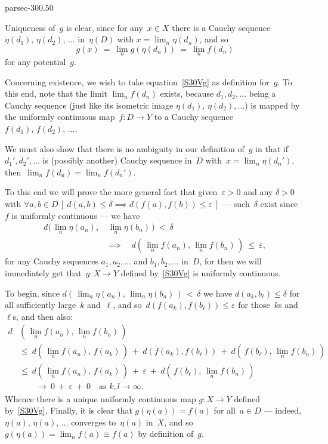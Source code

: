 \documentclass[b5page]{book}
\begin{document}
\begin{solution}{parsec-300.50}
\begin{enumerate}
Uniqueness of~$g$ is clear,
since for any~$x\in X$
there is a Cauchy sequence $\eta(d_1),\,\eta(d_2),\,\dotsc$
in~$\eta(D)$ 
with $x=\lim_n \eta(d_n)$, 
and so
\begin{equation}
\label{S30Vg}
\textstyle g(x)\ =\ \lim_n g(\eta(d_n))\ =\ \lim_n f(d_n)
\end{equation}
for any potential~$g$.

Concerning existence,
we wish to take equation~\eqref{S30Vg} as definition for~$g$.
To this end, note that the limit $\lim_n f(d_n)$ exists,
because $d_1,d_2,\dotsc$ being a Cauchy sequence
(just like its isometric image $\eta(d_1),\,\eta(d_2),\dotsc$)
is mapped by the uniformly continuous map~$f\colon D\to Y$
to a Cauchy sequence $f(d_1),\,f(d_2),\,\dotsc$.

We must also show that there is no ambiguity in our definition
of~$g$ in that if~$d_1',d_2',\dotsc$
is (possibly another) Cauchy sequence in~$D$
with~$x=\lim_n \eta(d_n')$,
then~$\lim_n f(d_n)=\lim_n f(d_n')$.

To this end we will prove the more general fact
that given~$\varepsilon>0$ and any $\delta>0$
with $\forall a,b\in D \,[\ d(a,b)\leq \delta
\implies d(f(a),f(b))\leq \varepsilon\ ]$
--- such~$\delta$ exist since~$f$ is uniformly continuous ---
we have
\begin{equation*}
\begin{alignedat}{3}
\textstyle
d(\,\lim_n\eta(a_n),&\,\textstyle \lim_n\eta(b_n)\,)\ <\  \delta\\
&\textstyle\implies\quad
d(\,\lim_n f(a_n),\,\lim_n f(b_n)\,)\ \leq \ \varepsilon,
\end{alignedat}
\end{equation*}
for any Cauchy sequences
$a_1,a_2,\dotsc$ and $b_1,b_2,\dotsc$
in~$D$,
for then we will immediately get
that~$g\colon X\to Y$
defined by~\eqref{S30Vg}
is uniformly continuous.

To begin, since
$d(\, \lim_n \eta(a_n),\,\lim_n \eta(b_n)\,)
\,<\,\delta$
 we have $d(a_k,b_\ell)\leq \delta$
for all sufficiently large~$k$ and~$\ell$,
and so~$d(f(a_k),f(b_\ell))\leq \varepsilon$
for those~$k$s and~$\ell$s,
and then  also:
\begin{equation*}
\begin{alignedat}{3}
d&\textstyle{}(\,\lim_n f(a_n),\,\lim_n f(b_n)\,)\\
\ &\textstyle\leq\ 
d(\,\lim_n f(a_n),\,f(a_k)\,)
\ +\ 
d(f(a_k),f(b_\ell))
\ +\ 
d(\,f(b_\ell),\,\lim_n f(b_n)\,)\\
\ &\textstyle\leq\ 
d(\,\lim_n f(a_n),\,f(a_k)\,)
\ +\ 
\varepsilon
\ +\ 
d(\,f(b_\ell),\,\lim_n f(b_n)\,)\\
\ &\textstyle\qquad\longrightarrow\ 0\ +\ \varepsilon \ +\ 0\quad\text{as $k,l\to\infty$.}
\end{alignedat}
\end{equation*}
Whence there is a unique uniformly continuous
map $g\colon X\to Y$
defined by~\eqref{S30Vg}.
Finally,
it is clear that $g(\eta(a))=f(a)$
for all~$a\in D$ ---
indeed, $\eta(a),\,\eta(a),\,\dotsc$
converges to~$\eta(a)$ in~$X$,
and so~$g(\eta(a))=\lim_n f(a)\equiv f(a)$
by definition of~$g$.


\end{enumerate}
\end{solution}
\end{document}
